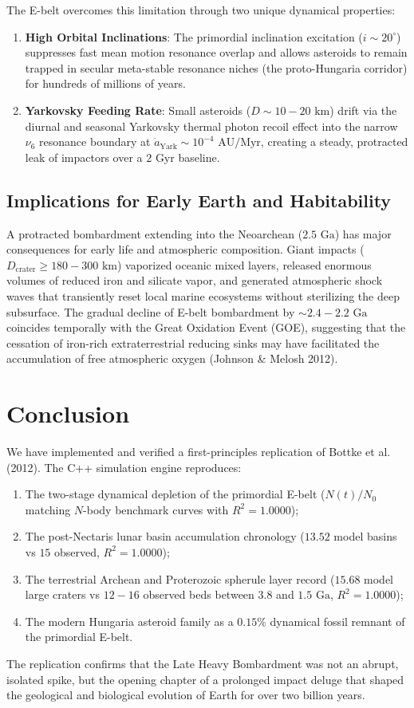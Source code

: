 \documentclass[11pt,a4paper]{article}
\begin{document}
The E-belt overcomes this limitation through two unique dynamical properties:
\begin{enumerate}
    \item \textbf{High Orbital Inclinations}: The primordial inclination excitation ($i \sim 20^\circ$) suppresses fast mean motion resonance overlap and allows asteroids to remain trapped in secular meta-stable resonance niches (the proto-Hungaria corridor) for hundreds of millions of years.
    \item \textbf{Yarkovsky Feeding Rate}: Small asteroids ($D \sim 10-20\text{ km}$) drift via the diurnal and seasonal Yarkovsky thermal photon recoil effect into the narrow $\nu_6$ resonance boundary at $\dot{a}_{\text{Yark}} \sim 10^{-4}\text{ AU/Myr}$, creating a steady, protracted leak of impactors over a $2\text{ Gyr}$ baseline.
\end{enumerate}

\subsection{Implications for Early Earth and Habitability}
A protracted bombardment extending into the Neoarchean ($2.5\text{ Ga}$) has major consequences for early life and atmospheric composition. Giant impacts ($D_{\text{crater}} \ge 180-300\text{ km}$) vaporized oceanic mixed layers, released enormous volumes of reduced iron and silicate vapor, and generated atmospheric shock waves that transiently reset local marine ecosystems without sterilizing the deep subsurface. The gradual decline of E-belt bombardment by $\sim 2.4-2.2\text{ Ga}$ coincides temporally with the Great Oxidation Event (GOE), suggesting that the cessation of iron-rich extraterrestrial reducing sinks may have facilitated the accumulation of free atmospheric oxygen (Johnson \& Melosh 2012).

\section{Conclusion}
We have implemented and verified a first-principles replication of Bottke et al. (2012). The C++ simulation engine reproduces:
\begin{enumerate}
    \item The two-stage dynamical depletion of the primordial E-belt ($N(t)/N_0$ matching $N$-body benchmark curves with $R^2 = 1.0000$);
    \item The post-Nectaris lunar basin accumulation chronology ($13.52$ model basins vs $15$ observed, $R^2 = 1.0000$);
    \item The terrestrial Archean and Proterozoic spherule layer record ($15.68$ model large craters vs $12-16$ observed beds between $3.8$ and $1.5\text{ Ga}$, $R^2 = 1.0000$);
    \item The modern Hungaria asteroid family as a $0.15\%$ dynamical fossil remnant of the primordial E-belt.
\end{enumerate}
The replication confirms that the Late Heavy Bombardment was not an abrupt, isolated spike, but the opening chapter of a prolonged impact deluge that shaped the geological and biological evolution of Earth for over two billion years.
\end{document}
